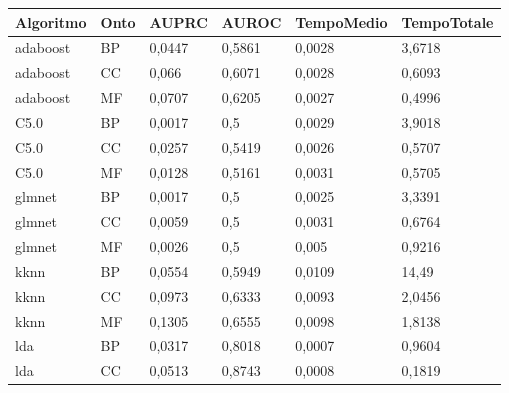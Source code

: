 \documentclass[12pt]{report}
\begin{document}
\begin{appendices}
\begin{table}[h]
\centering
\begin{tabular}{|l|l|l|l|l|l|}
\hline
\textbf{Algoritmo} & \textbf{Onto} & \textbf{AUPRC} & \textbf{AUROC} & \textbf{TempoMedio} & \textbf{TempoTotale} \\ \hline
adaboost           & BP            & 0,0447         & 0,5861         & 0,0028                   & 3,6718               \\ \hline
adaboost           & CC            & 0,066          & 0,6071         & 0,0028                   & 0,6093               \\ \hline
adaboost           & MF            & 0,0707         & 0,6205         & 0,0027                   & 0,4996               \\ \hline
C5.0               & BP            & 0,0017         & 0,5            & 0,0029                   & 3,9018               \\ \hline
C5.0               & CC            & 0,0257         & 0,5419         & 0,0026                   & 0,5707               \\ \hline
C5.0               & MF            & 0,0128         & 0,5161         & 0,0031                   & 0,5705               \\ \hline
glmnet             & BP            & 0,0017         & 0,5            & 0,0025                   & 3,3391               \\ \hline
glmnet             & CC            & 0,0059         & 0,5            & 0,0031                   & 0,6764               \\ \hline
glmnet             & MF            & 0,0026         & 0,5            & 0,005                    & 0,9216               \\ \hline
kknn               & BP            & 0,0554         & 0,5949         & 0,0109                   & 14,49                \\ \hline
kknn               & CC            & 0,0973         & 0,6333         & 0,0093                   & 2,0456               \\ \hline
kknn               & MF            & 0,1305         & 0,6555         & 0,0098                   & 1,8138               \\ \hline
lda                & BP            & 0,0317         & 0,8018         & 0,0007                   & 0,9604               \\ \hline
lda                & CC            & 0,0513         & 0,8743         & 0,0008                   & 0,1819               \\ \hline

\end{tabular}
\end{table}
\end{appendices}
\end{document}
